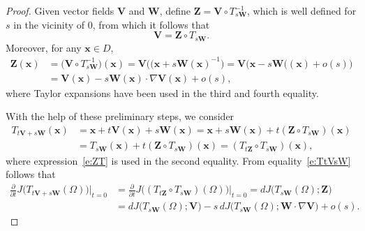 \documentclass{article}
\theoremstyle{remark}
\numberwithin{equation}{section}
\let\bs\boldsymbol
\begin{document}
\begin{proof}
Given vector fields $\bs V$ and $\bs W$, define $\bs Z = \bs V\circ T_{s\bs W}^{-1}$, which is well defined for $s$ in the vicinity of 0, from which it follows that
%
\begin{equation}\label{e:ZT}
\bs V = \bs Z\circ T_{s\bs W}.    
\end{equation}
%
Moreover, for any $\bs x\in D$,
%
\begin{equation}
\begin{aligned}
\bs Z(\bs x) &= \bigl(\bs V\circ T_{s\bs W}^{-1}\bigr)(\bs x)
= \bs V\bigl((\bs x + s\bs W(\bs x)^{-1}\bigr)
= \bs V\bigl(\bs x - s\bs W((\bs x) + o(s)\bigr)
\\
&= \bs V(\bs x) -s\bs W(\bs x)\cdot\nabla\bs V(\bs x) + o(s),
\end{aligned}
\end{equation}
%
where Taylor expansions have been used in the third and fourth equality.

With the help of these preliminary steps, we consider
%
\begin{equation}\label{e:TtVsW}
\begin{aligned}
T_{t\bs V + s\bs W}(\bs x) &= \bs x + t\bs V(\bs x) + s\bs W(\bs x)
= \bs x + s\bs W(\bs x) + t(\bs Z\circ T_{s\bs W})(\bs x) 
\\
&= T_{s\bs W}(\bs x) + t(\bs Z\circ T_{s\bs W})(\bs x) 
= (T_{t\bs Z}\circ T_{s\bs W})(\bs x),
\end{aligned}
\end{equation}
%
where expression~\eqref{e:ZT} is used in the second equality.
%
From equality~\eqref{e:TtVsW} follows that
%
\begin{equation}
\begin{aligned}
\frac\partial{\partial t} J\bigl(T_{t\bs V + s\bs W}(\Omega)\bigr)\big|_{t=0}
&= \frac\partial{\partial t} J\bigl((T_{t\bs Z}\circ T_{s\bs W})(\Omega)\bigr)\big|_{t=0}
= dJ\bigl(T_{s\bs W}(\Omega);\bs Z\bigr)
\\
&=dJ\bigl(T_{s\bs W}(\Omega);\bs V\bigr)-
s\,dJ\bigl(T_{s\bs W}(\Omega);\bs W\cdot\nabla\bs V\bigr) + o(s).
\end{aligned}    
\end{equation}

\end{proof}
\end{document}
